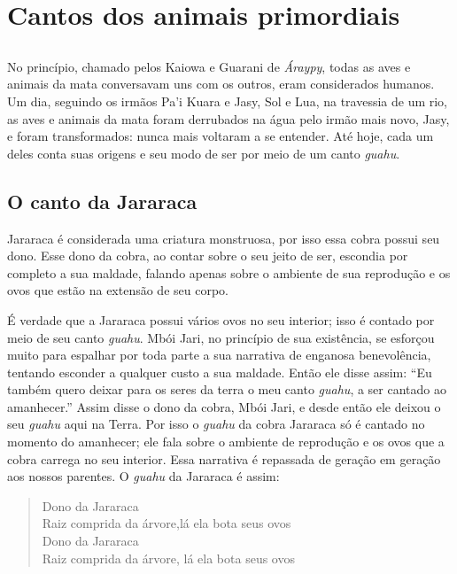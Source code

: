 \part{Cantos dos animais primordiais}%

\chapter*{}
\thispagestyle{empty}
\vspace*{\fill}
No princípio, chamado pelos Kaiowa e Guarani de \textit{Áraypy}, todas as
aves e animais da mata conversavam uns com os outros, eram considerados
humanos. Um dia, seguindo os irmãos Pa'i Kuara e Jasy, Sol e Lua, na
travessia de um rio, as aves e animais da mata foram derrubados na água
pelo irmão mais novo, Jasy, e foram transformados: nunca mais voltaram a
se entender. Até hoje, cada um deles conta suas origens e seu modo de
ser por meio de um canto \textit{guahu}.
\vspace*{\fill}

\chapter{O canto da Jararaca}

 Jararaca é considerada uma criatura monstruosa, por isso essa cobra
possui seu dono. Esse dono da cobra, ao contar sobre o seu jeito de ser,
escondia por completo a sua maldade, falando apenas sobre o ambiente de
sua reprodução e os ovos que estão na extensão de seu corpo.

É verdade que a Jararaca possui vários ovos no seu interior; isso é
contado por meio de seu canto \textit{guahu}. Mbói Jari, no princípio de
sua existência, se esforçou muito para espalhar por toda parte a sua
narrativa de enganosa benevolência, tentando esconder a qualquer custo a
sua maldade. Então ele disse assim: ``Eu também quero deixar para os
seres da terra o meu canto \textit{guahu}, a ser cantado ao amanhecer.''
Assim disse o dono da cobra, Mbói Jari, e desde então ele deixou o seu
\textit{guahu} aqui na Terra. Por isso o \textit{guahu} da cobra Jararaca só
é cantado no momento do amanhecer; ele fala sobre o ambiente de
reprodução e os ovos que a cobra carrega no seu interior. Essa narrativa
é repassada de geração em geração aos nossos parentes. O \textit{guahu} da
Jararaca é assim:

\begin{verse}
Dono da Jararaca\\
Raiz comprida da árvore,\footnotemark lá ela bota seus ovos\\
Dono da Jararaca\\
Raiz comprida da árvore, lá ela bota seus ovos
\end{verse}

